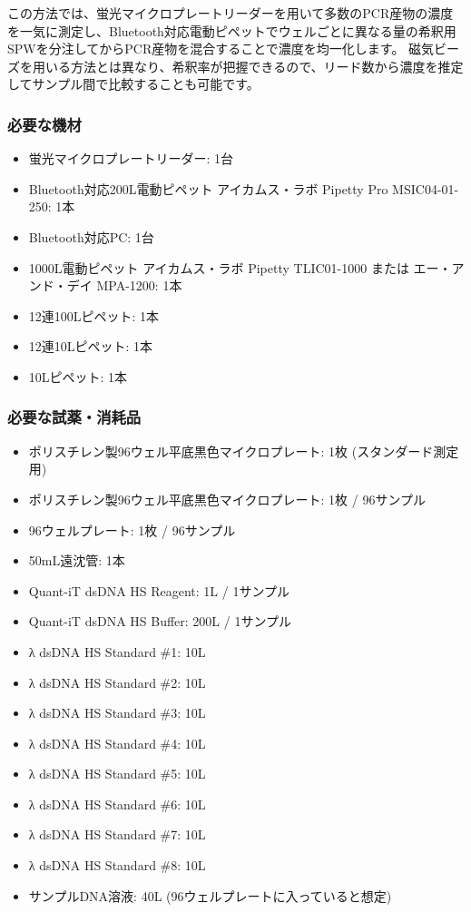 \documentclass[titlepage,10pt,a4paper,uplatex]{jsbook}
\begin{document}
この方法では、蛍光マイクロプレートリーダーを用いて多数のPCR産物の濃度を一気に測定し、Bluetooth対応電動ピペットでウェルごとに異なる量の希釈用SPWを分注してからPCR産物を混合することで濃度を均一化します。
磁気ビーズを用いる方法とは異なり、希釈率が把握できるので、リード数から濃度を推定してサンプル間で比較することも可能です。

\subsubsection{必要な機材}
\begin{itemize}
\item 蛍光マイクロプレートリーダー: 1台
\item Bluetooth対応200{\textmu}L電動ピペット アイカムス・ラボ Pipetty Pro MSIC04-01-250: 1本
\item Bluetooth対応PC: 1台
\item 1000{\textmu}L電動ピペット アイカムス・ラボ Pipetty TLIC01-1000 または エー・アンド・デイ MPA-1200: 1本
\item 12連100{\textmu}Lピペット: 1本
\item 12連10{\textmu}Lピペット: 1本
\item 10{\textmu}Lピペット: 1本
\end{itemize}

\subsubsection{必要な試薬・消耗品}
\begin{itemize}
\item ポリスチレン製96ウェル平底黒色マイクロプレート: 1枚 (スタンダード測定用)
\item ポリスチレン製96ウェル平底黒色マイクロプレート: 1枚 / 96サンプル
\item 96ウェルプレート: 1枚 / 96サンプル
\item 50mL遠沈管: 1本
\item Quant-iT dsDNA HS Reagent: 1{\textmu}L / 1サンプル
\item Quant-iT dsDNA HS Buffer: 200{\textmu}L / 1サンプル
\item λ dsDNA HS Standard \#1: 10{\textmu}L
\item λ dsDNA HS Standard \#2: 10{\textmu}L
\item λ dsDNA HS Standard \#3: 10{\textmu}L
\item λ dsDNA HS Standard \#4: 10{\textmu}L
\item λ dsDNA HS Standard \#5: 10{\textmu}L
\item λ dsDNA HS Standard \#6: 10{\textmu}L
\item λ dsDNA HS Standard \#7: 10{\textmu}L
\item λ dsDNA HS Standard \#8: 10{\textmu}L
\item サンプルDNA溶液: 40{\textmu}L (96ウェルプレートに入っていると想定)
\end{itemize}
\end{document}
